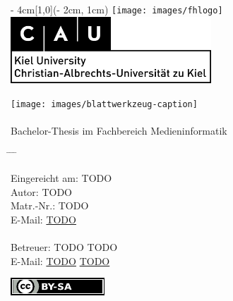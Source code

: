 
\begin{titlepage}
  \vspace*{20ex}
  \begin{textblock*}{\paperwidth - 4cm}[1,0](\paperwidth - 2cm, 1cm)
    \centering
    \texttt{[image: images/fhlogo]}
    \hfill
    \includegraphics[height=2.5cm]{images/logo-cau-kiel.png}
  \end{textblock*}
  \begin{center}
    \sffamily{}
    \texttt{[image: images/blattwerkzeug-caption]} \\[2ex]
    {\Large\docsubtitle} \\[4ex]
    {Bachelor-Thesis im Fachbereich Medieninformatik}
  \end{center}
  \vspace*{10ex}
  \begin{tabbing}
    \hspace{8em} \= \hspace{14em} \= \hspace{8em} \= \kill

    Eingereicht am: \> TODO \\[5ex]
    Autor: \> TODO \\
    Matr.-Nr.: \> TODO \\
    E-Mail: \> \href{mailto:TODO}{TODO} \\

    \\
    Betreuer: \> TODO \> TODO \\
    E-Mail: \> \href{mailto:TODO}{TODO} \> \href{mailto:TODO}{TODO}
  \end{tabbing}
  \vfill
  \centering \href{https://creativecommons.org/licenses/by-sa/4.0/}{\includegraphics{images/licenselogo}}
\end{titlepage}

\restoregeometry                 %

\cleardoublepage

